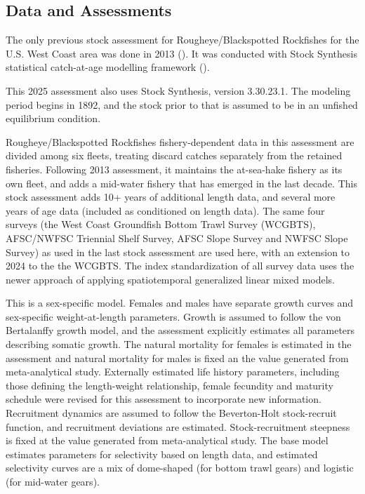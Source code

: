 \documentclass[
]{scrartcl}
\begin{document}
\subsection{Data and Assessments}\label{data-and-assessments}

The only previous stock assessment for Rougheye/Blackspotted Rockfishes
for the U.S. West Coast area was done in 2013
(). It
was conducted with Stock Synthesis statistical catch-at-age modelling
framework ().

This 2025 assessment also uses Stock Synthesis, version 3.30.23.1. The
modeling period begins in 1892, and the stock prior to that is assumed
to be in an unfished equilibrium condition.

Rougheye/Blackspotted Rockfishes fishery-dependent data in this
assessment are divided among six fleets, treating discard catches
separately from the retained fisheries. Following 2013 assessment, it
maintains the at-sea-hake fishery as its own fleet, and adds a mid-water
fishery that has emerged in the last decade. This stock assessment adds
10+ years of additional length data, and several more years of age data
(included as conditioned on length data). The same four surveys (the
West Coast Groundfish Bottom Trawl Survey (WCGBTS), AFSC/NWFSC Triennial
Shelf Survey, AFSC Slope Survey and NWFSC Slope Survey) as used in the
last stock assessment are used here, with an extension to 2024 to the
the WCGBTS. The index standardization of all survey data uses the newer
approach of applying spatiotemporal generalized linear mixed models.

This is a sex-specific model. Females and males have separate growth
curves and sex-specific weight-at-length parameters. Growth is assumed
to follow the von Bertalanffy growth model, and the assessment
explicitly estimates all parameters describing somatic growth. The
natural mortality for females is estimated in the assessment and natural
mortality for males is fixed an the value generated from meta-analytical
study. Externally estimated life history parameters, including those
defining the length-weight relationship, female fecundity and maturity
schedule were revised for this assessment to incorporate new
information. Recruitment dynamics are assumed to follow the
Beverton-Holt stock-recruit function, and recruitment deviations are
estimated. Stock-recruitment steepness is fixed at the value generated
from meta-analytical study. The base model estimates parameters for
selectivity based on length data, and estimated selectivity curves are a
mix of dome-shaped (for bottom trawl gears) and logistic (for mid-water
gears).
\end{document}

